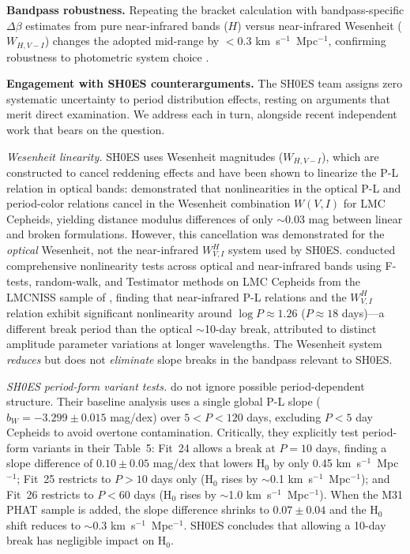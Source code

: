 \documentclass[preprint, linenumbers]{aastex701}
\begin{document}
\textbf{Bandpass robustness.} Repeating the bracket calculation with bandpass-specific $\Delta\beta$ estimates from pure near-infrared bands ($H$) versus near-infrared Wesenheit ($W_{H,V-I}$) changes the adopted mid-range by $<0.3$ km~s$^{-1}$~Mpc$^{-1}$, confirming robustness to photometric system choice \citep{Macri2015,Riess2016}.

\textbf{Engagement with SH0ES counterarguments.} The SH0ES team assigns zero systematic uncertainty to period distribution effects, resting on arguments that merit direct examination. We address each in turn, alongside recent independent work that bears on the question.

\textit{Wesenheit linearity.} SH0ES uses Wesenheit magnitudes ($W_{H,V-I}$), which are constructed to cancel reddening effects and have been shown to linearize the P-L relation in optical bands: \citet{Ngeow2005} demonstrated that nonlinearities in the optical P-L and period-color relations cancel in the Wesenheit combination $W(V,I)$ for LMC Cepheids, yielding distance modulus differences of only $\sim$0.03 mag between linear and broken formulations. However, this cancellation was demonstrated for the \textit{optical} Wesenheit, not the near-infrared $W^H_{V,I}$ system used by SH0ES. \citet{Bhardwaj2016} conducted comprehensive nonlinearity tests across optical and near-infrared bands using F-tests, random-walk, and Testimator methods on LMC Cepheids from the LMCNISS sample of \citet{Macri2015}, finding that near-infrared P-L relations and the $W^H_{V,I}$ relation exhibit significant nonlinearity around $\log P \approx 1.26$ ($P \approx 18$ days)---a different break period than the optical $\sim$10-day break, attributed to distinct amplitude parameter variations at longer wavelengths. The Wesenheit system \textit{reduces} but does not \textit{eliminate} slope breaks in the bandpass relevant to SH0ES.

\textit{SH0ES period-form variant tests.} \citet{Riess2022} do not ignore possible period-dependent structure. Their baseline analysis uses a single global P-L slope ($b_W = -3.299 \pm 0.015$ mag/dex) over $5 < P < 120$ days, excluding $P < 5$ day Cepheids to avoid overtone contamination. Critically, they explicitly test period-form variants in their Table~5: Fit~24 allows a break at $P = 10$ days, finding a slope difference of $0.10 \pm 0.05$ mag/dex that lowers H$_0$ by only 0.45 km~s$^{-1}$~Mpc$^{-1}$; Fit~25 restricts to $P > 10$ days only (H$_0$ rises by $\sim$0.1 km~s$^{-1}$~Mpc$^{-1}$); and Fit~26 restricts to $P < 60$ days (H$_0$ rises by $\sim$1.0 km~s$^{-1}$~Mpc$^{-1}$). When the M31 PHAT sample is added, the slope difference shrinks to $0.07 \pm 0.04$ and the H$_0$ shift reduces to $\sim$0.3 km~s$^{-1}$~Mpc$^{-1}$. SH0ES concludes that allowing a 10-day break has negligible impact on H$_0$.
\end{document}
